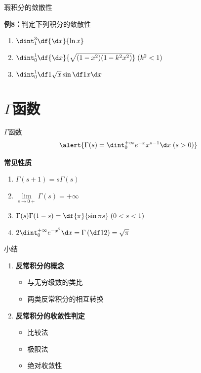 \begin{frame}{瑕积分的敛散性}
	\linespread{1.2}\pause 
	\begin{exampleblock}{{\bf 例8：}判定下列积分的敛散性\hfill}\pause 
		\begin{enumerate}
		  \item $\dint_1^3\df{\d x}{\ln x}$\pause 
		  \item $\dint_0^1\df{\d x}{\sqrt{(1-x^2)(1-k^2x^2)}}\;(k^2<1)$\pause 
		  \item $\dint_0^1\df 1{\sqrt{x}}\sin\df 1x\d x$
		\end{enumerate}
	\end{exampleblock}
\end{frame}

\section{$\Gamma$函数}

\begin{frame}{$\Gamma$函数}
	\linespread{1.2}
	$$\alert{\Gamma(s)=\dint_0^{+\infty}e^{-x}x^{s-1}\d x\;(s>0)}$$\pause 
	\begin{alertblock}{{\bf 常见性质}\hfill}\pause 
		\begin{enumerate}
		  \item $\Gamma(s+1)=s\Gamma(s)$\pause 
		  \item $\lim\limits_{s\to 0+}\Gamma(s)= +\infty$\pause 
		  \item $\Gamma(s)\Gamma(1-s)=\df{\pi}{\sin \pi s}\;(0<s<1)$\pause 
		  \item $2\dint_0^{+\infty}e^{-x^2}\d x=\Gamma\left(\df 12\right)=\sqrt{\pi}$
		\end{enumerate}
	\end{alertblock}
\end{frame}

\begin{frame}[<+->]{小结}
	\linespread{1.5}
	\begin{enumerate}
	  \item {\bf 反常积分的概念}
	  \begin{itemize}
	    \item 与无穷级数的类比
	    \item 两类反常积分的相互转换
	  \end{itemize}
	  \item {\bf 反常积分的收敛性判定}
	  \begin{itemize}
	    \item 比较法
	    \item 极限法
	    \item 绝对收敛性
	  \end{itemize}
	\end{enumerate}
\end{frame}


